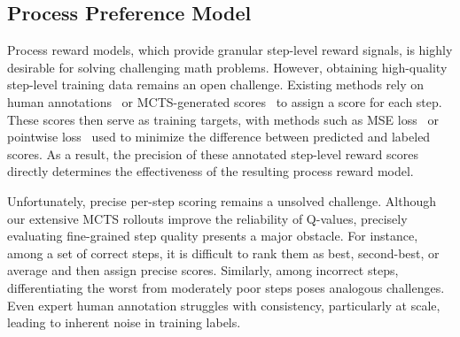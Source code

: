 \subsection{Process Preference Model}
Process reward models, which provide granular step-level reward signals, is highly desirable for solving challenging math problems. However, obtaining high-quality step-level training data remains an open challenge. Existing methods rely on  human annotations~\citep{lightman2023let} or MCTS-generated scores~\citep{restmcts,alphamath} to assign a score for each step. These scores then serve as training targets, with methods such as MSE loss~\citep{alphamath} or pointwise loss~\citep{mathshepherd,luo2024improve,restmcts} used to minimize the difference between predicted and labeled scores. 
As a result, the precision of these annotated step-level reward scores directly determines the effectiveness of the resulting process reward model. 


Unfortunately, precise per-step scoring remains a unsolved challenge. Although our extensive MCTS rollouts improve the reliability of Q-values, precisely evaluating fine-grained step quality presents a major obstacle. For instance, among a set of correct steps, it is difficult to rank them as best, second-best, or average and then assign precise scores. Similarly, among incorrect steps, differentiating the worst from moderately poor steps poses analogous challenges. Even expert human annotation struggles with consistency, particularly at scale, leading to inherent noise in training labels. 
 
